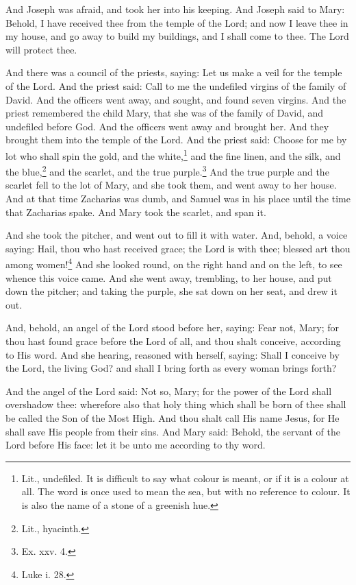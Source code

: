 \pend\pstart
And Joseph was afraid, and took her into his keeping. And Joseph said to Mary: Behold, I have received thee from the temple of the Lord; and now I leave thee in my house, and go away to build my buildings, and I shall come to thee. The Lord will protect thee.

\pend\pstart
{}

\pend\setcounter{pstartR}{1}\pstart
And there was a council of the priests, saying: Let us make a veil for the temple of the Lord. And the priest said: Call to me the undefiled virgins of the family of David. And the officers went away, and sought, and found seven virgins. And the priest remembered the child Mary, that she was of the family of David, and undefiled before God. And the officers went away and brought her. And they brought them into the temple of the Lord. And the priest said: Choose for me by lot who shall spin the gold, and the white,\footnote{Lit., undefiled. It is difficult to say what colour is meant, or if it is a colour at all. The word is once used to mean the sea, but with no reference to colour. It is also the name of a stone of a greenish hue.} and the fine linen, and the silk, and the blue,\footnote{Lit., hyacinth.} and the scarlet, and the true purple.\footnote{Ex. xxv. 4.} And the true purple and the scarlet fell to the lot of Mary, and she took them, and went away to her house. And at that time Zacharias was dumb, and Samuel was in his place until the time that Zacharias spake. And Mary took the scarlet, and span it.

\pend\pstart
{}

\pend\setcounter{pstartR}{1}\pstart
And she took the pitcher, and went out to fill it with water. And, behold, a voice saying: Hail, thou who hast received grace; the Lord is with thee; blessed art thou among women!\footnote{Luke i. 28.} And she looked round, on the right hand and on the left, to see whence this voice came. And she went away, trembling, to her house, and put down the pitcher; and taking the purple, she sat down on her seat, and drew it out.

\pend\pstart
And, behold, an angel of the Lord stood before her, saying: Fear not, Mary; for thou hast found grace before the Lord of all, and thou shalt conceive, according to His word. And she hearing, reasoned with herself, saying: Shall I conceive by the Lord, the living God? and shall I bring forth as every woman brings forth?

\pend\pstart
And the angel of the Lord said: Not so, Mary; for the power of the Lord shall overshadow thee: wherefore also that holy thing which shall be born of thee shall be called the Son of the Most High. And thou shalt call His name Jesus, for He shall save His people from their sins. And Mary said: Behold, the servant of the Lord before His face: let it be unto me according to thy word.

